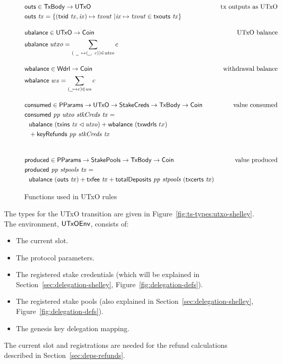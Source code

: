 \begin{figure}[htb]
  \begin{align*}
    & \fun{outs} \in \TxBody \to \UTxO
    & \text{tx outputs as UTxO} \\
    & \fun{outs} ~ \var{tx} =
        \left\{
          (\fun{txid} ~ \var{tx}, \var{ix}) \mapsto \var{txout} ~
          \middle|
          \var{ix} \mapsto \var{txout} \in \txouts{tx}
        \right\}
    \nextdef
    & \fun{ubalance} \in \UTxO \to \Coin
    & \text{UTxO balance} \\
    & \fun{ubalance} ~ utxo = \sum_{(~\wcard ~ \mapsto (\wcard, ~c)) \in \var{utxo}} c
    \nextdef
    & \fun{wbalance} \in \Wdrl \to \Coin
    & \text{withdrawal balance} \\
    & \fun{wbalance} ~ ws = \sum_{(\wcard\mapsto c)\in\var{ws}} c
    \nextdef
    & \fun{consumed} \in \PParams \to \UTxO \to \StakeCreds \to \TxBody \to \Coin
    & \text{value consumed} \\
    & \consumed{pp}{utxo}{stkCreds}{tx} = \\
    & ~~\ubalance{(\txins{tx} \restrictdom \var{utxo})} +
        \fun{wbalance}~(\fun{txwdrls}~{tx}) \\
    & ~~ + \keyRefunds{pp}{stkCreds}{tx} \\
    \nextdef
    & \fun{produced} \in \PParams \to \StakePools \to \TxBody \to \Coin
    & \text{value produced} \\
    & \fun{produced}~\var{pp}~\var{stpools}~\var{tx} = \\
    &~~\ubalance{(\outs{tx})}
    + \txfee{tx} + \totalDeposits{pp}{stpools}{(\txcerts{tx})}\\
  \end{align*}

  \caption{Functions used in UTxO rules}
  \label{fig:functions:utxo}
\end{figure}

\clearpage


The types for the UTxO transition are given in Figure~\ref{fig:ts-types:utxo-shelley}.
The environment, $\mathsf{UTxOEnv}$, consists of:

\begin{itemize}
  \item The current slot.
  \item The protocol parameters.
  \item The registered stake credentials (which will be explained in
    Section~\ref{sec:delegation-shelley}, Figure~\ref{fig:delegation-defs}).
  \item The registered stake pools
    (also explained in Section~\ref{sec:delegation-shelley},
    Figure~\ref{fig:delegation-defs}).
  \item The genesis key delegation mapping.
\end{itemize}
The current slot and registrations are needed for the refund calculations
described in Section~\ref{sec:deps-refunds}.

